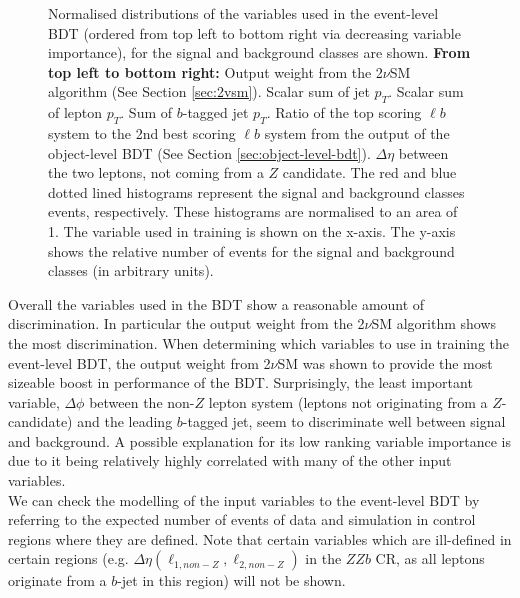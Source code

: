 \begin{figure}
    \caption{Normalised distributions of the variables used in the event-level BDT (ordered from top left to bottom right via decreasing variable importance), for the signal and background classes are shown. \textbf{From top left to bottom right:} Output weight from the 2$\nu$SM algorithm (See Section \ref{sec:2vsm}). Scalar sum of jet $p_{T}$. Scalar sum of lepton $p_{T}$. Sum of $b$-tagged jet $p_{T}$. Ratio of the top scoring $\ell b$ system to the 2nd best scoring $\ell b$ system from the output of the object-level BDT (See Section \ref{sec:object-level-bdt}). $\Delta \eta$ between the two leptons, not coming from a $Z$ candidate. The red and blue dotted lined histograms represent the signal and background classes events, respectively. These histograms are normalised to an area of 1. The variable used in training is shown on the x-axis. The y-axis shows the relative number of events for the signal and background classes (in arbitrary units). }
    \label{fig:norm-event-bdt-vars}
\end{figure}

Overall the variables used in the BDT show a reasonable amount of discrimination. In particular the output weight from the 2$\nu$SM algorithm shows the most discrimination. When determining which variables to use in training the event-level BDT, the output weight from 2$\nu$SM was shown to provide the most sizeable boost in performance of the BDT. Surprisingly, the least important variable, $\Delta \phi$ between the non-$Z$ lepton system (leptons not originating from a $Z$-candidate) and the leading $b$-tagged jet, seem to discriminate well between signal and background. A possible explanation for its low ranking variable importance is due to it being relatively highly correlated with many of the other input variables.\\

We can check the modelling of the input variables to the event-level BDT by referring to the expected number of events of data and simulation in control regions where they are defined. Note that certain variables which are ill-defined in certain regions (e.g. $\Delta \eta (\ell_{1,non-Z}, \ell_{2,non-Z})$ in the $ZZb$ CR, as all leptons originate from a $b$-jet in this region) will not be shown.\\

